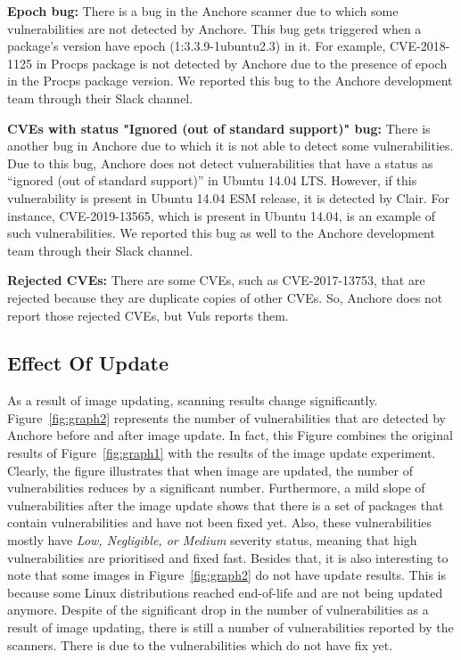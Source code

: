 \documentclass[a4paper,num-refs]{oup-contemporary}
\begin{document}
\textbf{Epoch bug:} There is a bug in the Anchore scanner due to which some vulnerabilities are 
		not detected by Anchore. This bug gets triggered when a package’s version have epoch 
		(1:3.3.9-1ubuntu2.3) in it. For example, CVE-2018-1125 in Procps package is not
		detected by Anchore due to the presence of epoch in the Procps package version.
		We reported this bug to the Anchore development team through their Slack channel.

\textbf{CVEs with status "Ignored (out of standard support)" bug:} There is another bug in Anchore due to 
		which it is not able to detect some vulnerabilities. Due to this bug, Anchore does not detect 
		vulnerabilities that have a status as “ignored (out of standard support)” in Ubuntu 14.04 LTS. 
		However, if this vulnerability is present in Ubuntu 14.04 ESM release, it is detected by Clair. 
		For instance, CVE-2019-13565, which is present in Ubuntu 14.04, is an example of such vulnerabilities. 
		We reported this bug as well to the Anchore development team through their Slack
		channel.

\textbf{Rejected CVEs:} There are some CVEs, such as CVE-2017-13753, that are rejected because they are duplicate copies of other CVEs. 
	So, Anchore does not report those rejected CVEs, but Vuls reports them.

\subsection{Effect Of Update}

As a result of image updating,
scanning results change significantly.
Figure~\ref{fig:graph2} represents the number of vulnerabilities that are detected by Anchore before and after 
image update. 
In fact, this Figure combines the original results of Figure~\ref{fig:graph1} with the results of the image update
experiment.
Clearly, the figure illustrates that when image are updated, the number of vulnerabilities reduces by a
significant number. Furthermore, a mild slope of vulnerabilities after the image update shows that
there is a set of packages that contain vulnerabilities and have not been fixed yet. Also, these
vulnerabilities mostly have \textit{Low, Negligible, or Medium} severity status, meaning that
high vulnerabilities are prioritised and fixed fast.
Besides that, it is also interesting to note that some images in Figure~\ref{fig:graph2}
do not have update results. This is because some Linux distributions reached end-of-life and
are not being updated anymore.
Despite of the significant drop in the number of vulnerabilities as a result of image updating,
there is still a number of vulnerabilities reported by the scanners. There is due to the
vulnerabilities which do not have fix yet.
\end{document}
